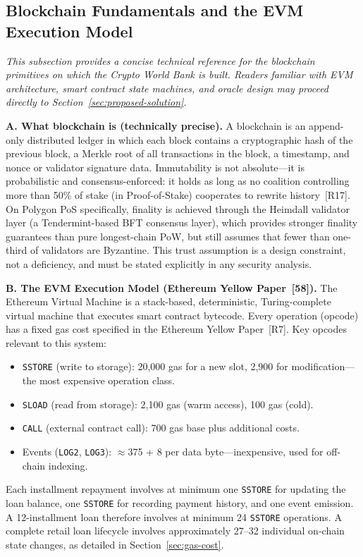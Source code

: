 \documentclass[12pt,a4paper]{report}
\begin{document}
\subsection{Blockchain Fundamentals and the EVM Execution Model}
\label{sec:blockchain-fundamentals}

\noindent\textit{\small This subsection provides a concise technical reference for the blockchain primitives on which the Crypto World Bank is built. Readers familiar with EVM architecture, smart contract state machines, and oracle design may proceed directly to Section~\ref{sec:proposed-solution}.}

\vspace{4pt}
\textbf{A. What blockchain is (technically precise).}
A blockchain is an append-only distributed ledger in which each block contains a cryptographic hash of the previous block, a Merkle root of all transactions in the block, a timestamp, and nonce or validator signature data. Immutability is not absolute---it is probabilistic and consensus-enforced: it holds as long as no coalition controlling more than 50\% of stake (in Proof-of-Stake) cooperates to rewrite history~[R17]. On Polygon PoS specifically, finality is achieved through the Heimdall validator layer (a Tendermint-based BFT consensus layer), which provides stronger finality guarantees than pure longest-chain PoW, but still assumes that fewer than one-third of validators are Byzantine. This trust assumption is a design constraint, not a deficiency, and must be stated explicitly in any security analysis.

\textbf{B. The EVM Execution Model (Ethereum Yellow Paper~[58]).}
The Ethereum Virtual Machine is a stack-based, deterministic, Turing-complete virtual machine that executes smart contract bytecode. Every operation (opcode) has a fixed gas cost specified in the Ethereum Yellow Paper~[R7]. Key opcodes relevant to this system:
\begin{itemize}[noitemsep]
  \item \texttt{SSTORE} (write to storage): 20,000 gas for a new slot, 2,900 for modification---the most expensive operation class.
  \item \texttt{SLOAD} (read from storage): 2,100 gas (warm access), 100 gas (cold).
  \item \texttt{CALL} (external contract call): 700 gas base plus additional costs.
  \item Events (\texttt{LOG2}, \texttt{LOG3}): $\approx$375 + 8 per data byte---inexpensive, used for off-chain indexing.
\end{itemize}
Each installment repayment involves at minimum one \texttt{SSTORE} for updating the loan balance, one \texttt{SSTORE} for recording payment history, and one event emission. A 12-installment loan therefore involves at minimum 24 \texttt{SSTORE} operations. A complete retail loan lifecycle involves approximately 27--32 individual on-chain state changes, as detailed in Section~\ref{sec:gas-cost}.
\end{document}
